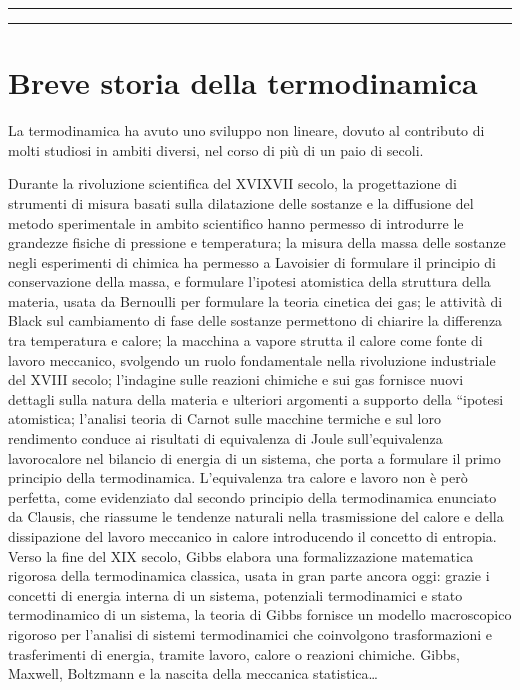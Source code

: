 \documentclass[letterpaper,10pt,italian]{jupyterBook}
\begin{document}
\bigskip\hrule\bigskip





\bigskip\hrule\bigskip


\sphinxstepscope


\section{Breve storia della termodinamica}
\label{\detokenize{ch/thermodynamics/foundation-history:breve-storia-della-termodinamica}}\label{\detokenize{ch/thermodynamics/foundation-history:physics-hs-thermodynamics-foundation-history}}\label{\detokenize{ch/thermodynamics/foundation-history::doc}}
\sphinxAtStartPar
La termodinamica ha avuto uno sviluppo non lineare, dovuto al contributo di molti studiosi in ambiti diversi, nel corso di più di un paio di secoli.

\sphinxAtStartPar
{}
Durante la rivoluzione scientifica del XVI\sphinxhyphen{}XVII secolo, la progettazione di strumenti di misura basati sulla dilatazione delle sostanze e la diffusione del metodo sperimentale in ambito scientifico hanno permesso di introdurre le grandezze fisiche di pressione e temperatura; la misura della massa delle sostanze negli esperimenti di chimica ha permesso a Lavoisier di formulare il principio di conservazione della massa, e formulare l’ipotesi atomistica della struttura della materia, usata da Bernoulli per formulare la teoria cinetica dei gas; le attività di Black sul cambiamento di fase delle sostanze permettono di chiarire la differenza tra temperatura e calore; la macchina a vapore strutta il calore come fonte di lavoro meccanico, svolgendo un ruolo fondamentale nella rivoluzione industriale del XVIII secolo; l’indagine sulle reazioni chimiche e sui gas fornisce nuovi dettagli sulla natura della materia e ulteriori argomenti a supporto della “ipotesi atomistica; l’analisi teoria di Carnot sulle macchine termiche e sul loro rendimento conduce ai risultati di equivalenza di Joule sull’equivalenza lavoro\sphinxhyphen{}calore nel bilancio di energia di un sistema, che porta a formulare il primo principio della termodinamica. L’equivalenza tra calore e lavoro non è però perfetta, come evidenziato dal secondo principio della termodinamica enunciato da Clausis, che riassume le tendenze naturali nella trasmissione del calore e della dissipazione del lavoro meccanico in calore introducendo il concetto di entropia. Verso la fine del XIX secolo, Gibbs elabora una formalizzazione matematica rigorosa della termodinamica classica, usata in gran parte ancora oggi: grazie i concetti di energia interna di un sistema, potenziali termodinamici e stato termodinamico di un sistema, la teoria di Gibbs fornisce un modello macroscopico rigoroso per l’analisi di sistemi termodinamici che coinvolgono trasformazioni e trasferimenti di energia, tramite lavoro, calore o reazioni chimiche.
Gibbs, Maxwell, Boltzmann e la nascita della meccanica statistica…
\end{document}
